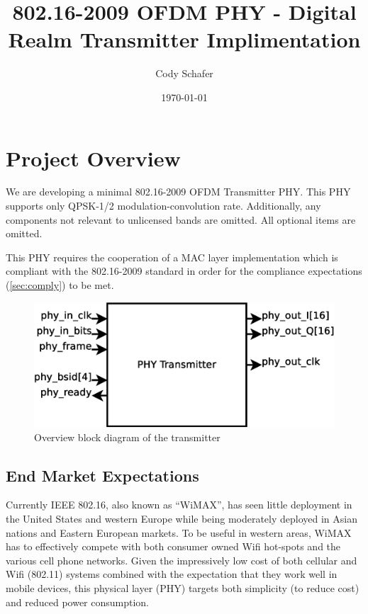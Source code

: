 \documentclass[dvips,10pt,twocolumn]{article}
\title{802.16-2009 OFDM PHY - Digital Realm Transmitter Implimentation}
\author{Cody Schafer}
\date{\today}
\begin{document}
\maketitle

\section{Project Overview}
We are developing a minimal 802.16-2009 OFDM Transmitter PHY.  This PHY
supports only QPSK-1/2 modulation-convolution rate. Additionally, any
components not relevant to unlicensed bands are omitted.  All optional items
are omitted.

This PHY requires the cooperation of a MAC layer implementation which is
compliant with the 802.16-2009 standard in order for the compliance
expectations (\autoref{sec:comply}) to be met.

\begin{figure}
\includegraphics[width=\linewidth]{t_block.eps}
\caption{Overview block diagram of the transmitter}
\end{figure}


	\subsection{End Market Expectations}
	Currently IEEE 802.16, also known as ``WiMAX'', has seen little
	deployment in the United States and western Europe while being
	moderately deployed in Asian nations and Eastern European markets.
	To be useful in western areas, WiMAX has to effectively compete
	with both consumer owned Wifi hot-spots and the various cell phone
	networks. Given the impressively low cost of both cellular and Wifi
	(802.11) systems combined with the expectation that they work well
	in mobile devices, this physical layer (PHY) targets both
	simplicity (to reduce cost) and reduced power consumption.
\end{document}
